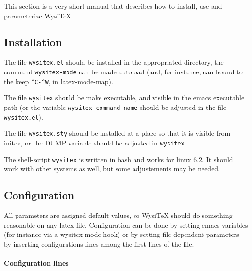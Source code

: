 \documentclass{article}
\let \lst \verb
\begin{document}
This section is a very short manual that describes how to install, use and
parameterize WysiTeX. 

\subsection {Installation}%

The file \lst"wysitex.el" should be installed in the appropriated directory, 
the command \lst"wysitex-mode" can be made autoload (and, for instance, can
bound to the keep \lst"^C-^W", in latex-mode-map). 

The file \lst"wysitex" should be make executable, and visible in the emacs
executable path (or the variable \lst"wysitex-command-name" should be
adjusted in the file \lst"wysitex.el"). 

The file \lst"wysitex.sty" should be installed at a place so that it is
visible  from initex, or the DUMP variable should be adjusted in
\lst"wysitex".  

The shell-script \lst"wysitex" is written in bash and works for linux 6.2. 
It should work with other systems as well, but some adjustements may be
needed. 


\subsection {Configuration}%

All parameters are assigned default values, so WysiTeX should do something
reasonable on any latex file.
Configuration can be done by setting emacs variables (for instance via a
wysitex-mode-hook) or by setting file-dependent parameters by 
inserting configurations lines among the first lines of the file. 


\paragraph {Configuration lines}
\end{document}
